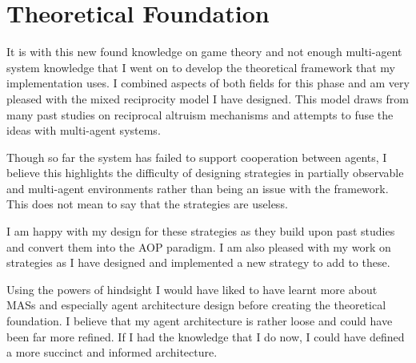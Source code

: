 \documentclass[]{final_report}
\begin{document}
\section{Theoretical Foundation}
It is with this new found knowledge on game theory and not enough multi-agent system knowledge that I went on to develop the theoretical framework that my implementation uses. I combined aspects of both fields for this phase and am very pleased with the mixed reciprocity model I have designed. This model draws from many past studies on reciprocal altruism mechanisms and attempts to fuse the ideas with multi-agent systems.\par 
Though so far the system has failed to support cooperation between agents, I believe this highlights the difficulty of designing strategies in partially observable and multi-agent environments rather than being an issue with the framework. This does not mean to say that the strategies are useless.\par 
I am happy with my design for these strategies as they build upon past studies and convert them into the AOP paradigm. I am also pleased with my work on strategies as I have designed and implemented a new strategy to add to these.\par 
Using the powers of hindsight I would have liked to have learnt more about MASs and especially agent architecture design before creating the theoretical foundation. I believe that my agent architecture is rather loose and could have been far more refined. If I had the knowledge that I do now, I could have defined a more succinct and informed architecture.
\end{document}
